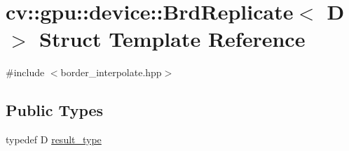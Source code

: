 \hypertarget{structcv_1_1gpu_1_1device_1_1BrdReplicate}{\section{cv\-:\-:gpu\-:\-:device\-:\-:Brd\-Replicate$<$ D $>$ Struct Template Reference}
\label{structcv_1_1gpu_1_1device_1_1BrdReplicate}
}


{\ttfamily \#include $<$border\-\_\-interpolate.\-hpp$>$}

\subsection*{Public Types}
\begin{DoxyCompactItemize}
\item 
typedef D \hyperlink{structcv_1_1gpu_1_1device_1_1BrdReplicate_af4ede6ffd2d31c3bdf73d04f720cd1ec}{result\-\_\-type}
\end{DoxyCompactItemize}
